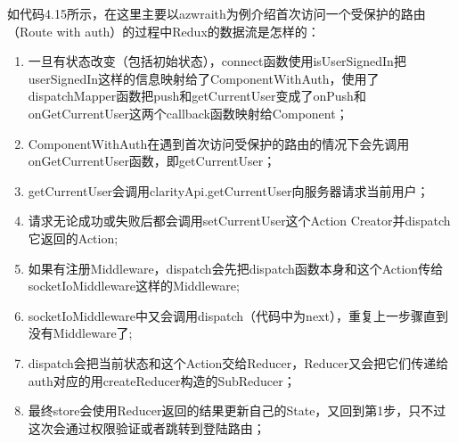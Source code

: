 如代码4.15所示，在这里主要以azwraith为例介绍首次访问一个受保护的路由（Route with auth）的过程中Redux的数据流是怎样的：
\begin{enumerate}
  \item 一旦有状态改变（包括初始状态），connect函数使用isUserSignedIn把userSignedIn这样的信息映射给了ComponentWithAuth，使用了dispatchMapper函数把push和getCurrentUser变成了onPush和onGetCurrentUser这两个callback函数映射给Component；
  \item ComponentWithAuth在遇到首次访问受保护的路由的情况下会先调用onGetCurrentUser函数，即getCurrentUser；
  \item getCurrentUser会调用clarityApi.getCurrentUser向服务器请求当前用户；
  \item 请求无论成功或失败后都会调用setCurrentUser这个Action Creator并dispatch它返回的Action;
  \item 如果有注册Middleware，dispatch会先把dispatch函数本身和这个Action传给socketIoMiddleware这样的Middleware;
  \item socketIoMiddleware中又会调用dispatch（代码中为next），重复上一步骤直到没有Middleware了;
  \item dispatch会把当前状态和这个Action交给Reducer，Reducer又会把它们传递给auth对应的用createReducer构造的SubReducer；
  \item 最终store会使用Reducer返回的结果更新自己的State，又回到第1步，只不过这次会通过权限验证或者跳转到登陆路由；
\end{enumerate}
